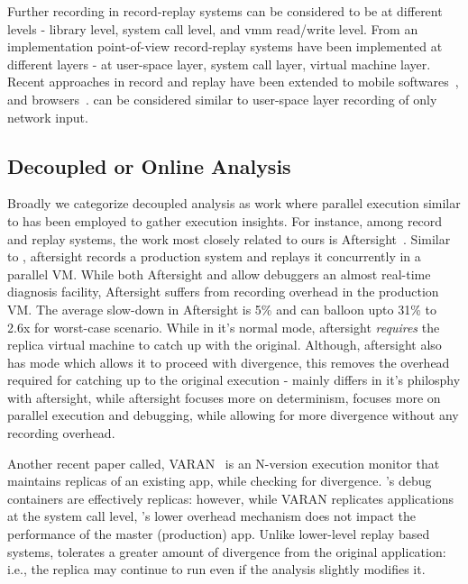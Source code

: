 Further recording in record-replay systems can be considered to be at different levels - library level, system call level, and vmm read/write level. 
From an implementation point-of-view record-replay systems have been implemented at different layers - at user-space layer, system call layer, virtual machine layer.
Recent approaches in record and replay have been extended to mobile softwares~\cite{mobileReplay,MobiPlay}, and browsers~\cite{browserReplay}.
\parikshan can be considered similar to user-space layer recording of only network input.


\subsection{Decoupled or Online Analysis}
\label{sec:relatedDecoupled}

Broadly we categorize decoupled analysis as work where parallel execution similar to \parikshan has been employed to gather execution insights.
For instance, among record and replay systems, the work most closely related to ours is Aftersight~\cite{aftersight}. 
Similar to \parikshan, aftersight records a production system and replays it concurrently in a parallel VM.
While both Aftersight and \parikshan allow debuggers an almost real-time diagnosis facility, Aftersight suffers from recording overhead in the production VM.
The average slow-down in Aftersight is 5\% and can balloon upto 31\% to 2.6x for worst-case scenario.
While in it's normal mode, aftersight \emph{requires} the replica virtual machine to catch up with the original.
Although, aftersight also has mode which allows it to proceed with divergence, this removes the overhead required for catching up to the original execution - \parikshan mainly differs in it's philosphy with aftersight, while aftersight focuses more on determinism, \parikshan focuses more on parallel execution and debugging, while allowing for more divergence without any recording overhead.


Another recent paper called, VARAN~\cite{Hosek:2015:VUE:2694344.2694390} is an N-version execution monitor that maintains replicas of an existing app, while checking for divergence.
\parikshan's debug containers are effectively replicas: however, while VARAN replicates applications at the system call level, \parikshan's lower overhead mechanism does not impact the performance of the master (production) app.
Unlike lower-level replay based systems, \parikshan tolerates a greater amount of divergence from the original application: i.e., the replica may continue to run even if the analysis slightly modifies it.

